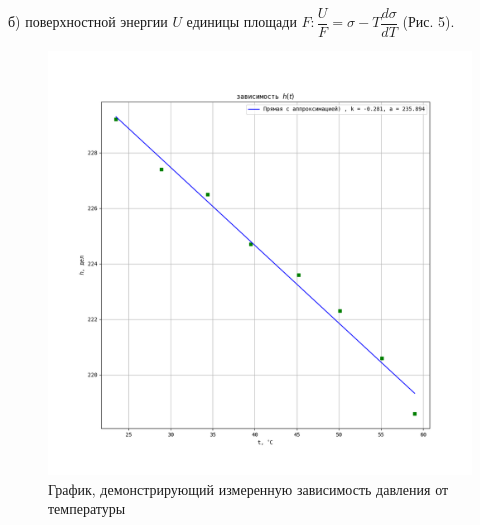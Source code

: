\documentclass[a4paper, 12pt]{article}
\begin{document}
б) поверхностной энергии $U$ единицы площади $F:   \dfrac{U}{F}= \sigma - T\dfrac{d\sigma}{dT}$ (Рис. 5). 

\begin{figure} [H]
	\centering 
	\includegraphics[scale=0.55]{img/h(t).png} 
	\caption{График, демонстрирующий измеренную зависимость давления от температуры} 
\end{figure}
\end{document}
